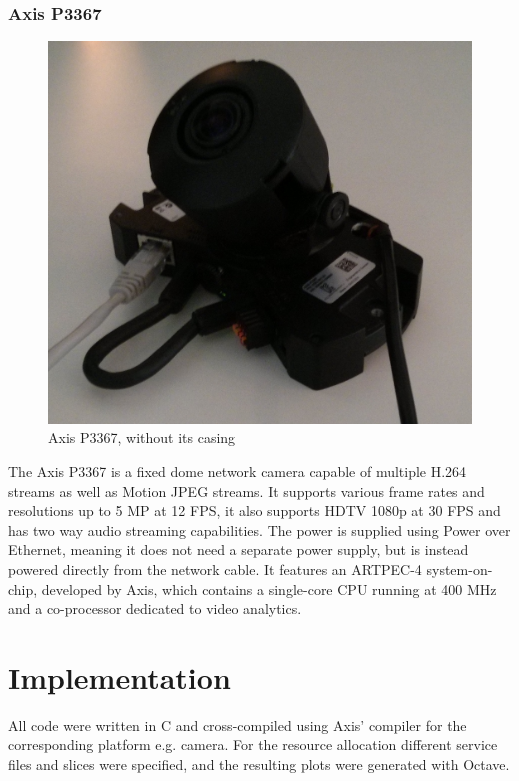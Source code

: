 \documentclass[nobiblatex]{LTHthesis}
\begin{document}
\subsection{Axis P3367}
\begin{figure}
    \centering
    \includegraphics[width=\textwidth]{p3367}
    \caption{Axis P3367, without its casing}
    \label{fig:P3367}
\end{figure}
The Axis P3367 is a fixed dome network camera capable of multiple H.264 streams as well as Motion JPEG streams. It supports various frame rates and resolutions up to 5 MP at 12 FPS, it also supports HDTV 1080p at 30 FPS and has two way audio streaming capabilities. The power is supplied using Power over Ethernet, meaning it does not need a separate power supply, but is instead powered directly from the network cable. It features an ARTPEC-4 system-on-chip, developed by Axis, which contains a single-core CPU running at 400 MHz and a co-processor dedicated to video analytics.
\chapter{Implementation}
All code were written in C and cross-compiled using Axis' compiler for the corresponding platform e.g. camera. For the resource allocation different service files and slices were specified, and the resulting plots were generated with Octave.
\end{document}

